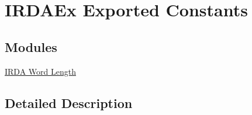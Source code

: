 \hypertarget{group___i_r_d_a_ex___exported___constants}{}\section{I\+R\+D\+A\+Ex Exported Constants}
\label{group___i_r_d_a_ex___exported___constants}
\subsection*{Modules}
\begin{DoxyCompactItemize}
\item 
\hyperlink{group___i_r_d_a_ex___word___length}{I\+R\+D\+A Word Length}
\end{DoxyCompactItemize}


\subsection{Detailed Description}
